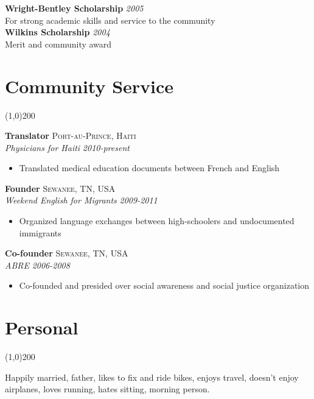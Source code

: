 \documentclass[11pt]{article}
\begin{document}
\noindent \textbf{Wright-Bentley Scholarship}  \hfill \emph{2005}\\
\noindent For strong academic skills and service to the community\\

\noindent \textbf{Wilkins Scholarship}  \hfill \emph{2004}\\
\noindent Merit and community award\\

\newpage

\section*{Community Service} %
\vspace{-7mm}
\line(1,0){200}
\vspace{2mm}

\noindent \textbf{Translator} \hfill \textsc{Port-au-Prince, Haiti}\\
\noindent \emph{Physicians for Haiti} \hfill \emph{2010-present}
\vspace{-2mm}
\begin{itemize}\itemsep0pt \parskip0pt 
\item Translated medical education documents between French and English
\end{itemize}

\noindent \textbf{Founder} \hfill \textsc{Sewanee, TN, USA}\\
\noindent \emph{Weekend English for Migrants} \hfill \emph{2009-2011}
\vspace{-2mm}
\begin{itemize}\itemsep0pt \parskip0pt 
\item Organized language exchanges between high-schoolers and undocumented immigrants
\end{itemize}


\noindent \textbf{Co-founder} \hfill \textsc{Sewanee, TN, USA}\\
\noindent \emph{ABRE} \hfill \emph{2006-2008}
\vspace{-2mm}
\begin{itemize}\itemsep0pt \parskip0pt 
\item Co-founded and presided over social awareness and social justice organization
\end{itemize}






\section*{Personal} %
\vspace{-7mm}
\line(1,0){200}
\vspace{2mm}

\noindent Happily married, father, likes to fix and ride bikes, enjoys travel, doesn't enjoy airplanes, loves running, hates sitting, morning person.
\end{document}
